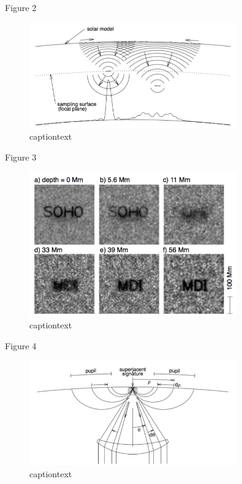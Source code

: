 \documentclass{beamer}
\begin{document}
\begin{frame}{Figure 2}
    \begin{figure}
        \includegraphics[width=0.8\textwidth]{fig_2.png}
        \caption{captiontext}
    \end{figure}
\end{frame}

\begin{frame}{Figure 3}
    \begin{figure}
        \includegraphics[width=0.8\textwidth]{fig_3.png}
        \caption{captiontext}
    \end{figure}
\end{frame}

\begin{frame}{Figure 4}
    \begin{figure}
        \includegraphics[width=0.8\textwidth]{fig_4.png}
        \caption{captiontext}
    \end{figure}
\end{frame}
\end{document}
